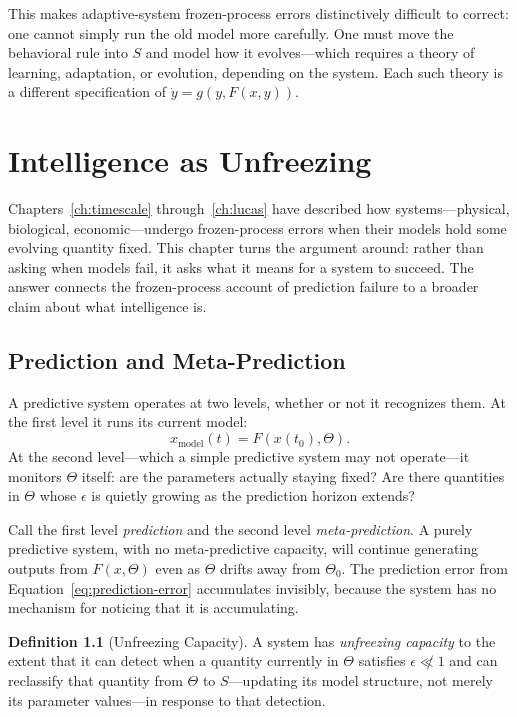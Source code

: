\documentclass[11pt]{book}
\theoremstyle{plain}
\theoremstyle{definition}
\newtheorem{definition}[theorem]{Definition}
\theoremstyle{remark}
\begin{document}
This makes adaptive-system frozen-process errors distinctively difficult to correct: one cannot simply run the old model more carefully. One must move the behavioral rule into $S$ and model how it evolves---which requires a theory of learning, adaptation, or evolution, depending on the system. Each such theory is a different specification of $\dot y = g(y, F(x,y))$.

\chapter{Intelligence as Unfreezing}
\label{ch:intelligence}

Chapters~\ref{ch:timescale} through~\ref{ch:lucas} have described how systems---physical, biological, economic---undergo frozen-process errors when their models hold some evolving quantity fixed. This chapter turns the argument around: rather than asking when models fail, it asks what it means for a system to succeed. The answer connects the frozen-process account of prediction failure to a broader claim about what intelligence is.

\section{Prediction and Meta-Prediction}

A predictive system operates at two levels, whether or not it recognizes them. At the first level it runs its current model:
\[
x_{\mathrm{model}}(t) = F(x(t_0), \Theta).
\]
At the second level---which a simple predictive system may not operate---it monitors $\Theta$ itself: are the parameters actually staying fixed? Are there quantities in $\Theta$ whose $\epsilon$ is quietly growing as the prediction horizon extends?

Call the first level \emph{prediction} and the second level \emph{meta-prediction}. A purely predictive system, with no meta-predictive capacity, will continue generating outputs from $F(x, \Theta)$ even as $\Theta$ drifts away from $\Theta_0$. The prediction error from Equation~\eqref{eq:prediction-error} accumulates invisibly, because the system has no mechanism for noticing that it is accumulating.

\begin{definition}[Unfreezing Capacity]
A system has \emph{unfreezing capacity} to the extent that it can detect when a quantity currently in $\Theta$ satisfies $\epsilon \not\ll 1$ and can reclassify that quantity from $\Theta$ to $S$---updating its model structure, not merely its parameter values---in response to that detection.
\end{definition}
\end{document}
